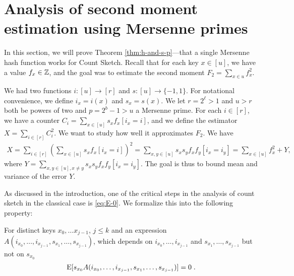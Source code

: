 

\section{Analysis of second moment estimation using Mersenne primes}
\label{sec:analysis-two-for-one}
In this section, we will prove Theorem \ref{thm:h-and-s-p}---that a single Mersenne hash function works for Count Sketch.
Recall that for each key $x\in [u]$, we have a value $f_x\in \mathbb Z$, and the
goal was to estimate the second moment $F_2 = \sum_{x\in u}f_x^2$.

We had two functions $i:[u]\to[r]$ and $s:[u]\to\{-1,1\}$. 
For notational convenience, we define $i_x=i(x)$ and $s_x=s(x)$.
We let $r=2^\ell>1$ and $u>r$ both be powers of two and $p=2^b-1>u$ a Mersenne prime.
For each $i\in [r]$, we have a counter 
$C_i=\sum_{x\in[u]} s_x f_x[i_x=i]$, and we define the 
estimator $X=\sum_{i\in[r]} C_i^2$. We want to study how
well it approximates $F_2$.
We have 
\begin{align}
X=\sum_{i\in[r]}\left( \sum_{x\in[u]}s_x f_x[i_x=i]\right)^2
=\sum_{x,y\in[u]}s_x s_y f_x f_y[i_x=i_y]
=\sum_{x\in[u]} f_x^2+Y,
\label{eq:decomp}
\end{align}
where $Y=\sum_{x,y\in[u],x\neq y} s_x s_y f_x f_y [i_x = i_y]$.
The goal is thus to bound mean and variance of the error $Y$.

As discussed in the introduction, one of the critical steps in the analysis of count sketch in the classical case is \cref{eq:E-0}.
We formalize this into the following property:
\begin{property}\label{prop:independence}
    For distinct keys $x_0, \ldots x_{j - 1}$, $j \le k$
    and an expression $A(i_{x_0}, \ldots, i_{x_{j - 1}}, s_{x_1}, \ldots, s_{x_{j - 1}})$,
    which depends on $i_{x_0}, \ldots, i_{x_{j - 1}}$ and $s_{x_1}, \ldots, s_{x_{j - 1}}$
    but not on $s_{x_0}$
    \begin{align}
        \operatorname*{E}[s_{x_0} A(i_{x_0}, \ldots, i_{x_{j - 1}}, s_{x_1}, \ldots, s_{x_{j - 1}})] = 0\; .
    \end{align}
\end{property}

